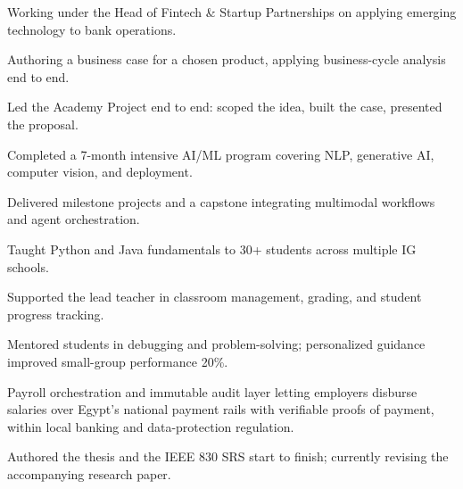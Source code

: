 \documentclass[a4paper,10pt]{article}
\begin{document}

\begin{cvitems}
  \item Working under the Head of Fintech \& Startup Partnerships on applying
        emerging technology to bank operations.
  \item Authoring a business case for a chosen product, applying business-cycle
        analysis end to end.
\end{cvitems}

\begin{cvitems}
  \item Led the Academy Project end to end: scoped the idea, built the case,
        presented the proposal.
\end{cvitems}

\begin{cvitems}
  \item Completed a 7-month intensive AI/ML program covering NLP, generative AI,
        computer vision, and deployment.
  \item Delivered milestone projects and a capstone integrating multimodal
        workflows and agent orchestration.
\end{cvitems}

\begin{cvitems}
  \item Taught Python and Java fundamentals to 30+ students across multiple IG
        schools.
  \item Supported the lead teacher in classroom management, grading, and student
        progress tracking.
  \item Mentored students in debugging and problem-solving; personalized guidance
        improved small-group performance 20\%.
\end{cvitems}


\begin{cvitems}
  \item Payroll orchestration and immutable audit layer letting employers
        disburse salaries over Egypt's national payment rails with verifiable
        proofs of payment, within local banking and data-protection regulation.
  \item Authored the thesis and the IEEE 830 SRS start to finish; currently
        revising the accompanying research paper.
\end{cvitems}
\end{document}
